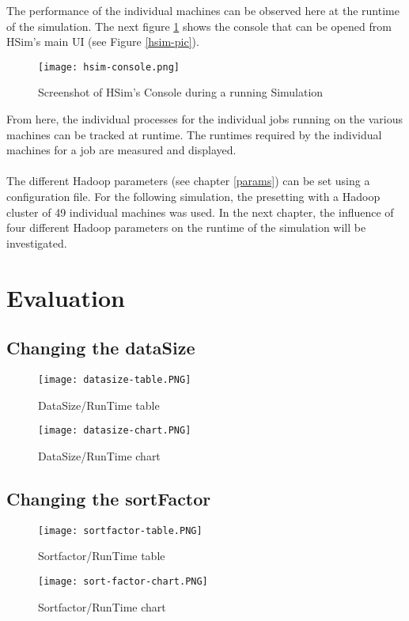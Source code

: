 The performance of the individual machines can be observed here at the runtime of the simulation. The next figure \ref{hsim-console} shows the console that can be opened from HSim's main UI (see Figure \ref{hsim-pic}).
\begin{figure}[H]
	\centering
	\texttt{[image: hsim-console.png]}
	\caption[Caption for LOF]{Screenshot of HSim's Console during a running Simulation}
	\label{hsim-console}
\end{figure}
From here, the individual processes for the individual jobs running on the various machines can be tracked at runtime. The runtimes required by the individual machines for a job are measured and displayed.
\\\\
The different Hadoop parameters (see chapter \ref{params}) can be set using a configuration file. For the following simulation, the presetting with a Hadoop cluster of 49 individual machines was used. In the next chapter, the influence of four different Hadoop parameters on the runtime of the simulation will be investigated.
\chapter{Evaluation}
\label{eval}
\section{Changing the dataSize}
\begin{figure}[H]
	\centering
	\texttt{[image: datasize-table.PNG]}
	\caption[Caption for LOF]{DataSize/RunTime table}
	\label{datasize-table}
\end{figure}
\begin{figure}[H]
	\centering
	\texttt{[image: datasize-chart.PNG]}
	\caption[Caption for LOF]{DataSize/RunTime chart}
	\label{datasize-chart}
\end{figure}
\section{Changing the sortFactor}
\begin{figure}[H]
	\centering
	\texttt{[image: sortfactor-table.PNG]}
	\caption[Caption for LOF]{Sortfactor/RunTime table}
	\label{sortfactor-table}
\end{figure}
\begin{figure}[H]
	\centering
	\texttt{[image: sort-factor-chart.PNG]}
	\caption[Caption for LOF]{Sortfactor/RunTime chart}
	\label{sort-factor-chart}
\end{figure}

